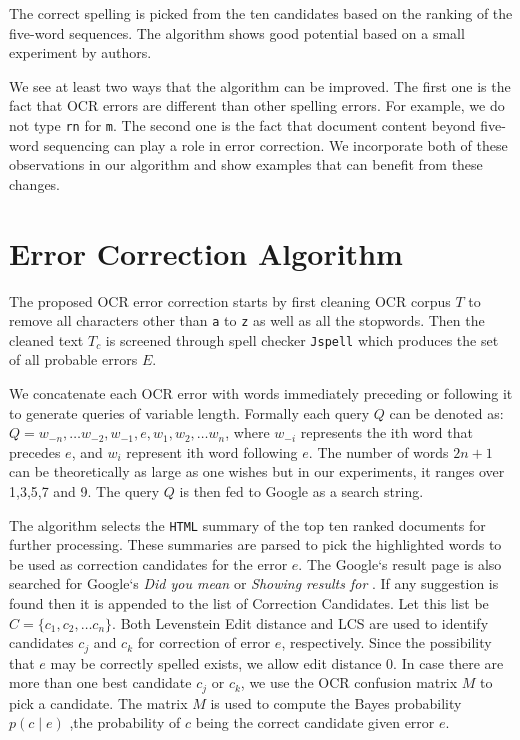 \documentclass{article}
\begin{document}
The correct spelling is picked from the ten candidates based on the
ranking of the five-word sequences. The algorithm shows good potential
based on a small experiment by authors.

We see at least two ways that the algorithm can be improved. The first
one is the fact that OCR errors are different than other spelling
errors. For example, we do not type {\tt rn} for {\tt m}. The second
one is the fact that document content beyond five-word sequencing can
play a role in error correction. We incorporate both of these
observations in our algorithm and show examples that can benefit from
these changes.

\section{Error Correction Algorithm}
\label{sec:algorithm}

The proposed OCR error correction starts by first cleaning OCR corpus
$T$ to remove all characters other than {\tt a} to {\tt z} as well as
all the stopwords.  Then the cleaned text $T_c$ is screened through
spell checker {\tt Jspell} which produces the set of all probable
errors $E$.

We concatenate each OCR error with words immediately
preceding or following it to generate queries of variable length.
Formally each query $Q$ can be denoted as: $Q = w_{-n}, \dots w_{-2}
,w_{-1} ,e, w_1,w_2, \dots w_n$, where $w_{-i}$ represents the ith
word that precedes $e$, and $w_i$ represent ith word following
$e$. The number of words $2n+1$ can be theoretically as large as one
wishes but in our experiments, it ranges over 1,3,5,7 and 9.  The
query $Q$ is then fed to Google as a search string. 

The algorithm selects the {\tt HTML} summary of the top ten ranked
documents for further processing. These summaries are parsed to pick
the highlighted words to be used as correction candidates for the
error $e$. The Google`s result page is also searched for Google`s
{\em Did you mean} or {\em Showing results for} .  If any suggestion is
found then it is appended to the list of Correction Candidates. Let
this list be $C = \{ c_1, c_2, \dots c_n \}$. Both Levenstein Edit
distance and LCS are used to identify candidates $c_j$ and $c_k$ for
correction of error $e$, respectively. Since the possibility that $e$
may be correctly spelled exists, we allow edit distance 0. In case
there are more than one best candidate $c_j$ or $c_k$, we use the OCR
confusion matrix $M$ to pick a candidate. The matrix $M$ is used to
compute the Bayes probability $p(c \mid e)$ ,the probability of $c$
being the correct candidate given error $e$.
\end{document}

